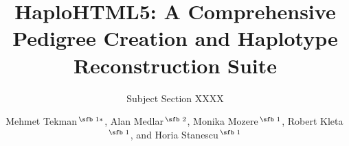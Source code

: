 \documentclass{assets/biotemplate/bioinfo}
\numberwithin{equation}{section}
\begin{document}

\subtitle{Subject Section XXXX}

\title[HaploHTML5]{HaploHTML5: A Comprehensive Pedigree Creation and Haplotype Reconstruction Suite}
\author[Sample \textit{et~al}.]{Mehmet Tekman\,$^{\text{\sfb 1}*}$, Alan Medlar\,$^{\text{\sfb 2}}$, Monika Mozere\,$^{\text{\sfb 1}}$, Robert Kleta\,$^{\text{\sfb 1}}$, and Horia Stanescu\,$^{\text{\sfb 1}}$}
\address{$^{\text{\sf 1}}$Division of Medicine, University College London,  London,  NW3 2PF, UK and \\
$^{\text{\sf 2}}$Institute of Biotechnology, University of Helsinki, Helsinki, 00014, Finland.}






\maketitle









\end{document}
